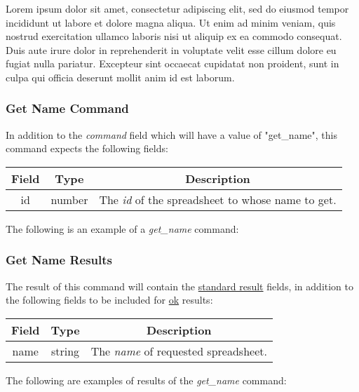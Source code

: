 Lorem ipsum dolor sit amet, consectetur adipiscing elit, sed do eiusmod tempor incididunt ut labore et dolore magna aliqua. Ut enim ad minim veniam, quis nostrud exercitation ullamco laboris nisi ut aliquip ex ea commodo consequat. Duis aute irure dolor in reprehenderit in voluptate velit esse cillum dolore eu fugiat nulla pariatur. Excepteur sint occaecat cupidatat non proident, sunt in culpa qui officia deserunt mollit anim id est laborum.

\subsubsection{Get Name Command}

In addition to the \emph{command} field which will have a value of "get\_name", this command expects the following fields:

\begin{table}[H]
    \begin{center}
        \begin{tabular}{|c|c|c|}\hline
            Field & Type & Description \\\hline
            id & number & The \emph{id} of the spreadsheet to whose name to get. \\\hline
        \end{tabular}
    \end{center}
\end{table}

The following is an example of a \emph{get\_name} command:



\subsubsection{Get Name Results}
The result of this command will contain the \hyperref[sec:message:result]{standard result} fields, in addition to the following fields to be included for \underline{ok} results:
\begin{table}[H]
    \begin{center}
        \begin{tabular}{|c|c|c|}\hline
            Field & Type & Description \\\hline
            name & string & The \emph{name} of requested spreadsheet. \\\hline
        \end{tabular}
    \end{center}
\end{table}

The following are examples of results of the \emph{get\_name} command:




